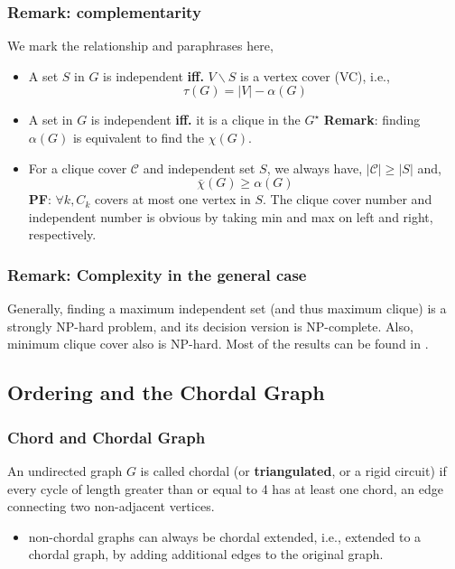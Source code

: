 \documentclass[../main]{subfiles}
\begin{document}
\subsubsection*{Remark: complementarity}
We mark the relationship and paraphrases here,
\begin{itemize}
      \item A set \(S\) in \(G\) is independent \textbf{iff.} \(V\backslash S\) is a vertex cover (VC), i.e.,
            \[\tau(G) = |V| - \alpha(G)\]
      \item A set in \(G\) is independent \textbf{iff.} it is a clique in the \(G^\star\)
            \textbf{Remark}: finding \(\alpha(G)\) is equivalent to find the \(\chi(G)\).
      \item For a clique cover \(\mathscr C\) and independent set \(S\), we always have, \(|\mathscr C| \ge |S|\) and,
            \[\bar \chi (G) \ge \alpha(G)\]
            \textbf{PF}: \(\forall k, C_k \) covers at most one vertex in \(S\). The clique cover number and independent number is obvious by taking min and max on left and right, respectively.
\end{itemize}

\subsubsection*{Remark: Complexity in the general case}

Generally, finding a maximum independent set (and thus maximum clique) is a strongly NP-hard problem, and its decision version is NP-complete. Also, minimum clique cover also is NP-hard. Most of the results can be found in \cite{schrijver_combinatorial_2003}.


\subsection{Ordering and the Chordal Graph}

\subsubsection*{Chord and Chordal Graph}

An undirected graph \(G\) is called chordal (or \textbf{triangulated}, or a rigid circuit) if every cycle of
length greater than or equal to 4 has at least one chord, an edge connecting two non-adjacent vertices.

\begin{itemize}
      \item non-chordal graphs can always be chordal extended, i.e., extended to a chordal graph, by adding additional edges to the original graph.
\end{itemize}
\end{document}
